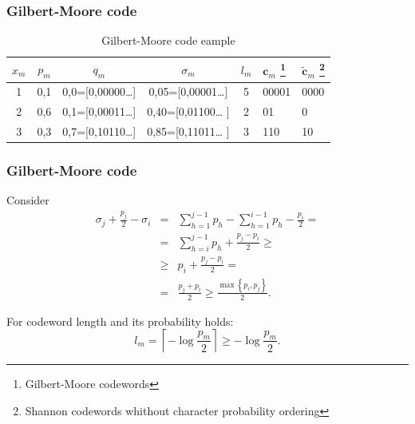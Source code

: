 \documentclass[14pt]{beamer}
\renewcommand{\vec}[1]{\ensuremath{\boldsymbol{#1}}}
\begin{document}
\begin{frame}
\frametitle{Gilbert-Moore code}
\begin{itemize}    

    \begin{table}[htbp]
    \caption{ Gilbert-Moore code eample} \label{tablGM}
    \begin{minipage}{\linewidth}
    \scalebox{0.75} {
    \begin{tabular}
     {|c|c|c|c|c|l|l|} \hline
     $x_m$ & $p_m$ & $q_m$ & $\sigma _m$ & $l_m$ & $\vec c_m$ \footnote
     {Gilbert-Moore codewords}
     &  $\tilde{\vec c}_m$ \footnote{Shannon codewords whithout character probability ordering}
     \\ \hline
     1& 0,1& 0,0=\small{[0,00000\dots ]}&
    0,05={\small{[0,00001\dots ]}}& 5& \small{00001}&\small 0000 \\
    \hline 2& 0,6& 0,1=\small[0,00011\dots ]& 0,40=\small[0,01100\dots
    ]& 2& \small 01&
    \small 0 \\
    \hline 3& 0,3& 0,7=\small[0,10110\ldots ]& 0,85=\small[0,11011\ldots
    ]& 3& \small 110&
    \small 10 \\
    \hline
    \end{tabular}
    }
    \end{minipage}
    \end{table}

\end{itemize}
\end{frame}


\begin{frame}
\frametitle{Gilbert-Moore code}
\begin{itemize}    
\small{

    \item Consider
    \begin{eqnarray*}
    \sigma _j  + \frac{p_j }{2} - \sigma _i &=& \sum_{h = 1}^{j - 1}
    p_h - \sum_{h = 1}^{i - 1} p_h - \frac{p_i }{2}
    = \\
    &=& \sum_{h = i}^{j - 1} p_h  + \frac{p_j - p_i }{2} \ge
    \\
    &\ge& p_i + \frac{p_j - p_i }{2} =\\
     &=&\frac{p_j + p_i }{2} \ge
    \frac{\max \left\{ {p_i ,p_j } \right\}}{2}.
    \end{eqnarray*}

    \item For codeword length and its probability holds:
    \[
    l_m = \left\lceil { - \log \frac{p_m }{2}} \right\rceil \ge - \log \frac{p_m
    }{2}.
    \]
}
\end{itemize}
\end{frame}
\end{document}
